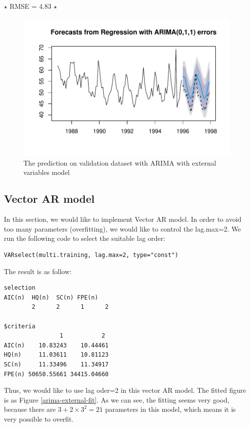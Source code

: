 \documentclass{article}
\begin{document}
$\star$ RMSE = 4.83 $\star$
\begin{figure}[H]
    \centering
    \includegraphics[width=0.65\linewidth]{images/arima-external-val}
    \caption{The prediction on validation dataset with ARIMA with external variables model}
    \label{arima-external-val}
\end{figure}

\vspace{4pt}
\subsection{Vector AR model}

In this section, we would like to implement Vector AR model. In order to avoid too many parameters (overfitting), we would like to control the lag.max=2. We run the 
following code to select the suitable lag order:
\begin{lstlisting}
VARselect(multi.training, lag.max=2, type="const")
\end{lstlisting}
The result is as follow:
\begin{lstlisting}
selection
AIC(n)  HQ(n)  SC(n) FPE(n) 
        2      2      1      2 

$criteria
                1           2
AIC(n)    10.83243    10.44461
HQ(n)     11.03611    10.81123
SC(n)     11.33496    11.34917
FPE(n) 50650.55661 34415.04660
\end{lstlisting}
Thus, we would like to use lag oder=2 in this vector AR model.
The fitted figure is as Figure \ref{arima-external-fit}. As we can see, the fitting seems very good, because there are 
$3+2\times 3^2=21$ parameters in this model, which means it is very possible to overfit.
\end{document}
